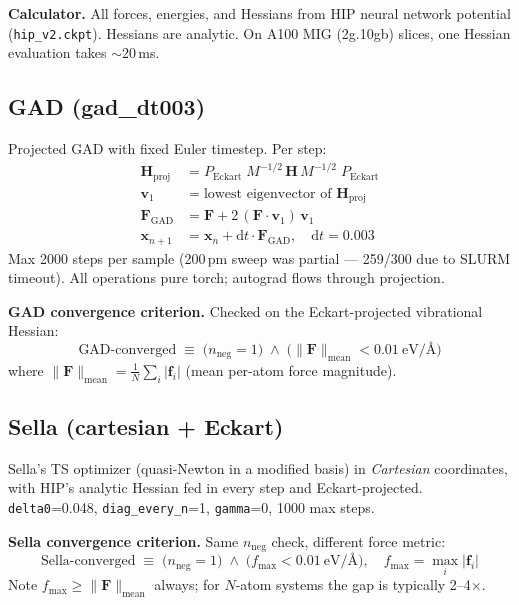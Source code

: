 \documentclass[11pt]{article}
\begin{document}
\textbf{Calculator.} All forces, energies, and Hessians from HIP neural
network potential (\texttt{hip\_v2.ckpt}). Hessians are analytic. On A100
MIG (2g.10gb) slices, one Hessian evaluation takes $\sim$20\,ms.

\subsection{GAD (gad\_dt003)}

Projected GAD with fixed Euler timestep. Per step:
\begin{align}
\mathbf{H}_{\text{proj}} &= P_{\text{Eckart}}\;M^{-1/2}\,\mathbf{H}\,M^{-1/2}\;P_{\text{Eckart}} \\
\mathbf{v}_1 &= \text{lowest eigenvector of } \mathbf{H}_{\text{proj}} \\
\mathbf{F}_{\text{GAD}} &= \mathbf{F} + 2\,(\mathbf{F} \cdot \mathbf{v}_1)\,\mathbf{v}_1 \\
\mathbf{x}_{n+1} &= \mathbf{x}_n + \mathrm{d}t \cdot \mathbf{F}_{\text{GAD}},\quad \mathrm{d}t = 0.003
\end{align}
Max 2000 steps per sample (200\,pm sweep was partial --- 259/300 due to
SLURM timeout). All operations pure torch; autograd flows through projection.

\textbf{GAD convergence criterion.} Checked on the Eckart-projected
vibrational Hessian:
\begin{equation}
\text{GAD-converged} \;\equiv\;
\bigl(n_{\text{neg}} = 1\bigr)\;\wedge\;
\bigl(\|\mathbf{F}\|_{\text{mean}} < 0.01~\text{eV/\AA}\bigr)
\label{eq:gad_conv}
\end{equation}
where $\|\mathbf{F}\|_{\text{mean}} = \frac{1}{N}\sum_i |\mathbf{f}_i|$
(mean per-atom force magnitude).

\subsection{Sella (cartesian + Eckart)}

Sella's TS optimizer (quasi-Newton in a modified basis) in \emph{Cartesian}
coordinates, with HIP's analytic Hessian fed in every step and
Eckart-projected. \texttt{delta0}=0.048, \texttt{diag\_every\_n}=1,
\texttt{gamma}=0, 1000 max steps.

\textbf{Sella convergence criterion.} Same $n_{\text{neg}}$ check,
different force metric:
\begin{equation}
\text{Sella-converged} \;\equiv\;
\bigl(n_{\text{neg}} = 1\bigr)\;\wedge\;
\bigl(f_{\max} < 0.01~\text{eV/\AA}\bigr),
\quad f_{\max} = \max_i |\mathbf{f}_i|
\label{eq:sella_conv}
\end{equation}
Note $f_{\max} \geq \|\mathbf{F}\|_{\text{mean}}$ always; for $N$-atom
systems the gap is typically 2--4$\times$.
\end{document}
